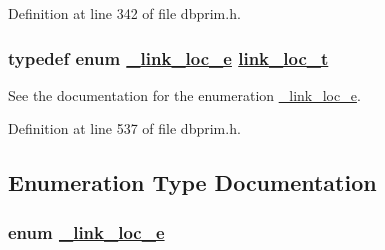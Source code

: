 Definition at line 342 of file dbprim.h.\hypertarget{group__dbprim__link_ga4}{
\subsubsection[link\_\-loc\_\-t]{\setlength{\rightskip}{0pt plus 5cm}typedef enum \hyperlink{group__dbprim__link_ga28}{\_\-link\_\-loc\_\-e} \hyperlink{group__dbprim__link_ga4}{link\_\-loc\_\-t}}}
\label{group__dbprim__link_ga4}


See the documentation for the enumeration \hyperlink{group__dbprim__link_ga28}{\_\-link\_\-loc\_\-e}.

Definition at line 537 of file dbprim.h.

\subsection{Enumeration Type Documentation}
\hypertarget{group__dbprim__link_ga28}{
\subsubsection[\_\-link\_\-loc\_\-e]{\setlength{\rightskip}{0pt plus 5cm}enum \hyperlink{group__dbprim__link_ga28}{\_\-link\_\-loc\_\-e}}}
\label{group__dbprim__link_ga28}


